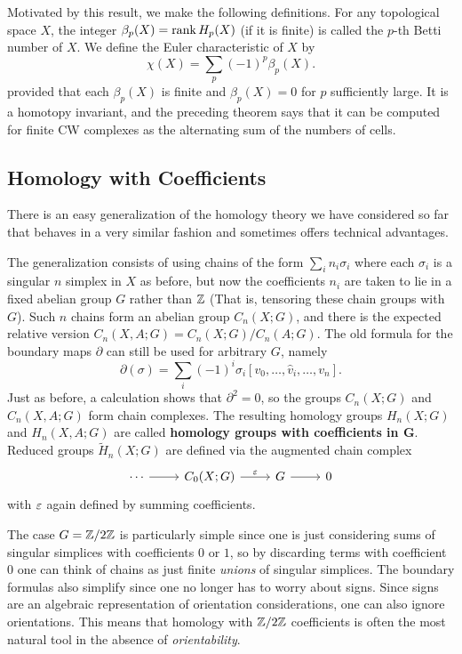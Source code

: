 Motivated by this result, we make the following definitions. For any topological space $X$, the integer $\beta_p(X)=\mathrm{rank}\, H_p(X)$ (if it is finite) is called the $p$-th Betti number of $X$. We define the Euler characteristic of $X$ by
\[\chi(X)=\sum_p(-1)^p\beta_p(X).\]
provided that each $\beta_p(X)$ is finite and $\beta_p(X)=0$ for $p$ sufficiently large. It is a homotopy invariant, and the preceding theorem says that it can be computed for finite CW complexes as the alternating sum of the numbers of cells.
\subsection{Homology with Coefficients}
There is an easy generalization of the homology theory we have considered so far that behaves in a very similar fashion and sometimes offers technical advantages.\par
The generalization consists of using chains of the form $\sum_in_i\sigma_i$ where each $\sigma_i$ is a singular $n$ simplex in $X$ as before, but now the coefficients $n_i$ are taken to lie in a fixed abelian group $G$ rather than $\mathbb{Z}$ (That is, tensoring these chain groups with $G$). Such $n$ chains form an abelian group $C_n(X;G)$, and there is the expected relative version $C_n(X,A;G)=C_n(X;G)/C_n(A;G)$. The old formula for the boundary maps $\partial$ can still be used for arbitrary $G$, namely
\[\partial(\sigma)=\sum_i(-1)^i\sigma_i[v_0,\dots,\widehat{v}_i,\dots,v_n].\]
Just as before, a calculation shows that $\partial^2=0$, so the groups $C_n(X;G)$ and $C_n(X,A;G)$ form chain complexes. The resulting homology groups $H_n(X;G)$ and $H_n(X,A;G)$ are called \textbf{homology groups with coefficients in $\bm{G}$}. Reduced groups $\widetilde{H}_n(X;G)$ are defined via the augmented chain complex 
\[\begin{tikzcd}
\cdots\ar[r]&C_0(X;G)\ar[r,"\eps"]&G\ar[r]&0
\end{tikzcd}\]
with $\varepsilon$ again defined by summing coefficients.\par
The case $G=\mathbb{Z}/2\mathbb{Z}$ is particularly simple since one is just considering sums of singular simplices with coefficients $0$ or $1$, so by discarding terms with coefficient $0$ one can think of chains as just finite \textit{unions} of singular simplices. The boundary formulas also simplify since one no longer has to worry about signs. Since signs are an algebraic representation of orientation considerations, one can also ignore orientations. This means that homology with $\mathbb{Z}/2\mathbb{Z}$ coefficients is often the most natural tool in the absence of \textit{orientability}.\par
